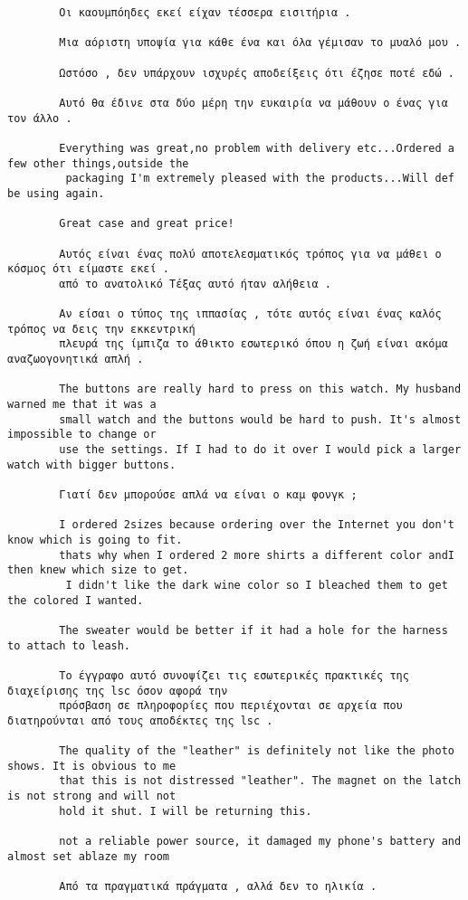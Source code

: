 \documentclass[11pt, a4paper]{article}
\begin{document}
\begin{verbatim}
		Οι καουμπόηδες εκεί είχαν τέσσερα εισιτήρια .
		
		Μια αόριστη υποψία για κάθε ένα και όλα γέμισαν το μυαλό μου .
		
		Ωστόσο , δεν υπάρχουν ισχυρές αποδείξεις ότι έζησε ποτέ εδώ .
		
		Αυτό θα έδινε στα δύο μέρη την ευκαιρία να μάθουν ο ένας για τον άλλο .
		
		Everything was great,no problem with delivery etc...Ordered a few other things,outside the
		 packaging I'm extremely pleased with the products...Will def be using again.
		
		Great case and great price!
		
		Αυτός είναι ένας πολύ αποτελεσματικός τρόπος για να μάθει ο κόσμος ότι είμαστε εκεί .
		από το ανατολικό Τέξας αυτό ήταν αλήθεια .
		
		Αν είσαι ο τύπος της ιππασίας , τότε αυτός είναι ένας καλός τρόπος να δεις την εκκεντρική 
		πλευρά της ίμπιζα το άθικτο εσωτερικό όπου η ζωή είναι ακόμα αναζωογονητικά απλή .
		
		The buttons are really hard to press on this watch. My husband warned me that it was a 
		small watch and the buttons would be hard to push. It's almost impossible to change or 
		use the settings. If I had to do it over I would pick a larger watch with bigger buttons.
		
		Γιατί δεν μπορούσε απλά να είναι ο καμ φονγκ ;
		
		I ordered 2sizes because ordering over the Internet you don't know which is going to fit.
		thats why when I ordered 2 more shirts a different color andI then knew which size to get.
		 I didn't like the dark wine color so I bleached them to get the colored I wanted.
		
		The sweater would be better if it had a hole for the harness to attach to leash.
		
		Το έγγραφο αυτό συνοψίζει τις εσωτερικές πρακτικές της διαχείρισης της lsc όσον αφορά την 
		πρόσβαση σε πληροφορίες που περιέχονται σε αρχεία που διατηρούνται από τους αποδέκτες της lsc .
		
		The quality of the "leather" is definitely not like the photo shows. It is obvious to me 
		that this is not distressed "leather". The magnet on the latch is not strong and will not
		hold it shut. I will be returning this.
		
		not a reliable power source, it damaged my phone's battery and almost set ablaze my room
		
		Από τα πραγματικά πράγματα , αλλά δεν το ηλικία .
		

\end{verbatim}
\end{document}
